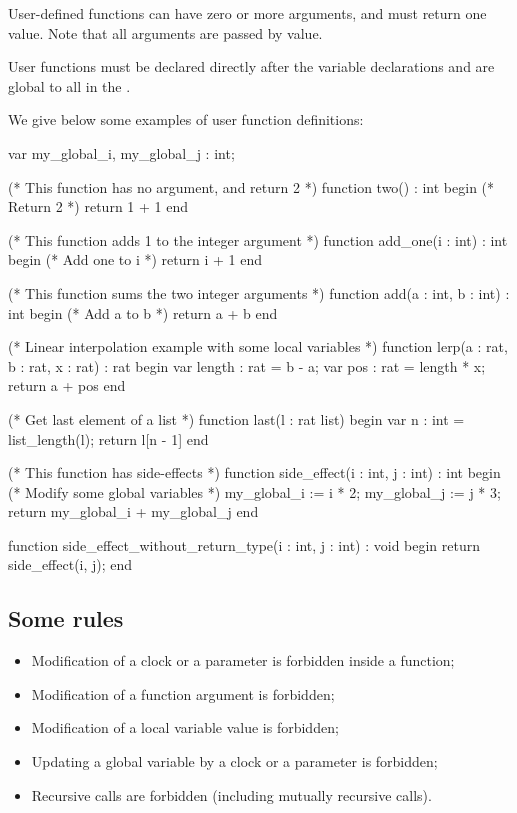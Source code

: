 User-defined functions can have zero or more arguments, and must return one value.
Note that all arguments are passed by value.

User functions must be declared directly after the variable declarations and are global to all \IPTA{} in the \NIPTA{}.

\begin{example}
We give below some examples of user function definitions:

\begin{IMITATORmodel}
	var
		my_global_i, my_global_j : int;

	(* This function has no argument, and return 2 *)
	function two() : int
	begin
		(* Return 2 *)
		return 1 + 1
	end

	(* This function adds 1 to the integer argument *)
	function add_one(i : int) : int
	begin
		(* Add one to i *)
		return i + 1
	end

	(* This function sums the two integer arguments *)
	function add(a : int, b : int) : int
	begin
		(* Add a to b *)
		return a + b
	end

	(* Linear interpolation example with some local variables *)
	function lerp(a : rat, b : rat, x : rat) : rat
	begin
		var length : rat = b - a;
		var pos : rat = length * x;
		return a + pos
	end

	(* Get last element of a list *)
	function last(l : rat list)
	begin
		var n : int = list_length(l);
		return l[n - 1]
	end

	(* This function has side-effects *)
	function side_effect(i : int, j : int) : int
	begin
		(* Modify some global variables *)
		my_global_i := i * 2;
		my_global_j := j * 3;
		return my_global_i + my_global_j
	end

	function side_effect_without_return_type(i : int, j : int) : void
	begin
		return side_effect(i, j);
	end

\end{IMITATORmodel}
\end{example}

\subsection{Some rules}

\begin{itemize}
	\item Modification of a clock or a parameter is forbidden inside a function;
	\item Modification of a function argument is forbidden;
	\item Modification of a local variable value is forbidden;
	\item Updating a global variable by a clock or a parameter is forbidden;
	\item Recursive calls are forbidden (including mutually recursive calls).
\end{itemize}

